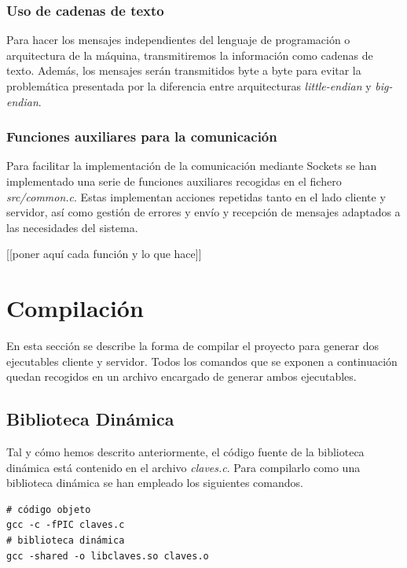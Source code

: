 \documentclass[]{article}
\begin{document}
\subsubsection{Uso de cadenas de texto}
\label{subsec:cadenas-texto}
Para hacer los mensajes independientes del lenguaje de programación o arquitectura de la máquina, transmitiremos la información como cadenas de texto. Además, los mensajes serán transmitidos byte a byte para evitar la problemática presentada por la diferencia entre  arquitecturas \textit{little-endian} y \textit{big-endian}.

\subsubsection{Funciones auxiliares para la comunicación}
\label{subsec:funciones}
Para facilitar la implementación de la comunicación mediante Sockets se han implementado una serie de funciones auxiliares recogidas en el fichero \textit{src/common.c}. Estas implementan acciones repetidas tanto en el lado cliente y servidor, así como gestión de errores y envío y recepción de mensajes adaptados a las necesidades del sistema. 

[[poner aquí cada función y lo que hace]]

\section{Compilación}
\label{sec:compilacion}
En esta sección se describe la forma de compilar el proyecto para generar dos ejecutables cliente y servidor. Todos los comandos que se exponen a continuación quedan recogidos en un archivo  encargado de generar ambos ejecutables. 

\subsection{Biblioteca Dinámica}
\label{subsec:biblioteca}
Tal y cómo hemos descrito anteriormente, el código fuente de la biblioteca dinámica está contenido en el archivo \textit{claves.c}. Para compilarlo como una biblioteca dinámica se han empleado los siguientes comandos.

\begin{center}
\begin{lstlisting}[caption=Compiación de biblioteca dinámica]
# código objeto
gcc -c -fPIC claves.c
# biblioteca dinámica
gcc -shared -o libclaves.so claves.o
\end{lstlisting}
\end{center}
\end{document}
